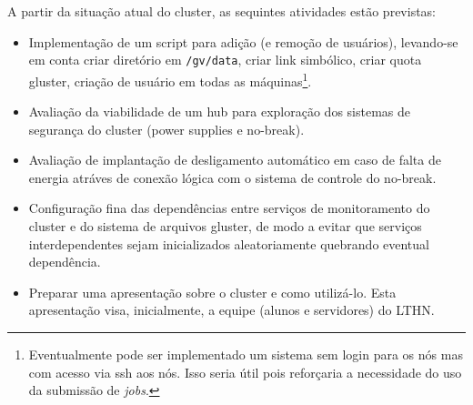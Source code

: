 A partir da situação atual do cluster, as sequintes atividades estão previstas:
\begin{itemize}
	\item[1] Implementação de um script para adição (e remoção de usuários), levando-se em conta criar diretório em \texttt{/gv/data}, criar link simbólico, criar quota gluster, criação de usuário em todas as máquinas\footnote{Eventualmente pode ser implementado um sistema sem login para os nós mas com acesso via ssh aos nós. Isso seria útil pois reforçaria a necessidade do uso da submissão de \textit{jobs}.}.
	\item[2] Avaliação da viabilidade de um hub para exploração dos sistemas de segurança do cluster (power supplies e no-break).
	\item[3] Avaliação de implantação de desligamento automático em caso de falta de energia atráves de conexão lógica com o sistema de controle do no-break.
	\item[4] Configuração fina das dependências entre serviços de monitoramento 
	do cluster e do sistema de arquivos gluster, de modo a evitar que serviços 
	interdependentes sejam inicializados aleatoriamente quebrando eventual 
	dependência.
	\item[5] Preparar uma apresentação sobre o cluster e como utilizá-lo. Esta apresentação visa, inicialmente, a equipe (alunos e servidores) do LTHN.
\end{itemize}

